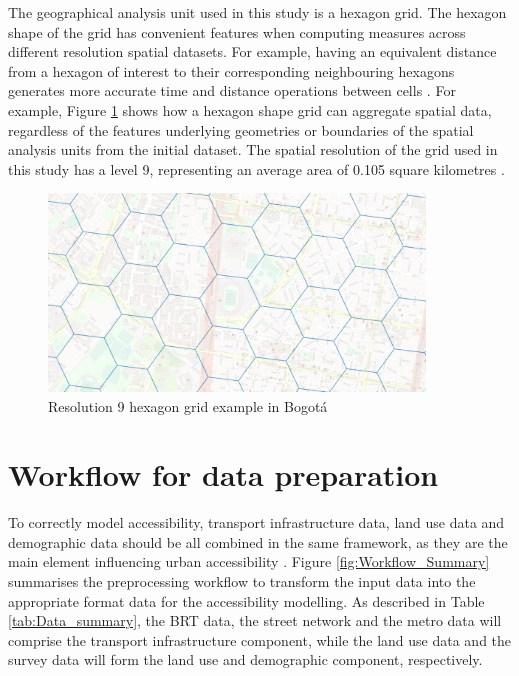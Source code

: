 \documentclass[12pt, a4paper]{report}
\begin{document}
The geographical analysis unit used in this study is a hexagon grid. The hexagon shape of the grid has convenient features when computing measures across different resolution spatial datasets. For example, having an equivalent distance from a hexagon of interest to their corresponding neighbouring hexagons generates more accurate time and distance operations between cells \citep{ubertechnologiesH3HexagonalHierarchical2023}. For example, Figure \ref{fig:Hex_grid_example} shows how a hexagon shape grid can aggregate spatial data, regardless of the features underlying geometries or boundaries of the spatial analysis units from the initial dataset. The spatial resolution of the grid used in this study has a level 9, representing an average area of 0.105 square kilometres \citep{ubertechnologiesH3HexagonalHierarchical2023}.

\begin{figure}[H]
    \centering
    \includegraphics[width=10cm]{Images/Hex_grid.png}
    \caption{Resolution 9 hexagon grid example in Bogotá \citep{openstreetmapcontributorsPlanetDumpRetrieved2023a}}
    \label{fig:Hex_grid_example}
\end{figure}

\section{Workflow for data preparation}

To correctly model accessibility, transport infrastructure data, land use data and demographic data should be all combined in the same framework, as they are the main element influencing urban accessibility \citep{pereiraIntroductionUrbanAccessibility2023a}. Figure \ref{fig:Workflow_Summary} summarises the preprocessing workflow to transform the input data into the appropriate format data for the accessibility modelling. As described in Table \ref{tab:Data_summary}, the BRT data, the street network and the metro data will comprise the transport infrastructure component, while the land use data and the survey data will form the land use and demographic component, respectively.
\end{document}
